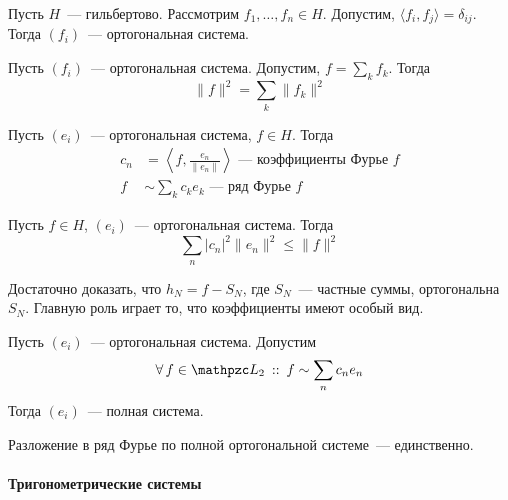 \documentclass[12pt,draft,timbord]{longnotes}
\begin{document}
\begin{defn}\label{defn:fourier::orthseries}
  Пусть $H$~--- гильбертово. Рассмотрим $f_1, \dotsc, f_n \in H$. 
  Допустим, $\langle f_i,f_j \rangle = \delta_{ij}$. Тогда $(f_i)$~--- ортогональная
  система.
\end{defn}

\begin{thrm}\label{thrm:fourier::orthseries::pif}
  Пусть $(f_i)$~--- ортогональная система. Допустим, $f = \sum_k f_k$. Тогда
  \[
    \|f\| ^2 = \sum_k \|f_k\|^2
  \]
\end{thrm}

\begin{defn}\label{defn:fourier::orthseries::fs}
  Пусть $(e_i)$~--- ортогональная система, $f \in H$. Тогда
  \[
    \begin{split}
      c_n &= \left\langle f, \frac{e_n}{\|e_n\|} \right\rangle \text{~--- коэффициенты Фурье $f$} \\
      f &\sim\sum_k c_k e_k  \text{~--- ряд Фурье $f$}
    \end{split}
  \]
  
\end{defn}

\begin{thrm}\label{thrm:fourier::orthseries::ineq}
  Пусть $f\in H$,  $(e_i)$~--- ортогональная система. Тогда \[
    \sum_n |c_n|^2 \|e_n\|^2 \leqslant \|f\|^2
  \]
\end{thrm}
 \begin{tproof}
   Достаточно доказать, что $h_N = f - S_N$, где $S_N$~--- частные суммы, ортогональна $S_N$.
   Главную роль играет то, что коэффициенты имеют особый вид.
 \end{tproof}

\begin{defn}\label{defn:fourier::orthseries::compl}
  Пусть $(e_i)$~--- ортогональная система. Допустим 
  \[
    \forall\, f \in \summb_2 \holds f \sim \sum_n c_n e_n 
  \]
  Тогда $(e_i)$~--- полная система.
\end{defn}
\begin{stat}\label{stat:fourier::orthseries::uniq}
  Разложение в ряд Фурье по полной ортогональной системе~--- единственно.
\end{stat}

\paragraph{Тригонометрические системы}
\label{par:fourier::trigseries}
\end{document}
